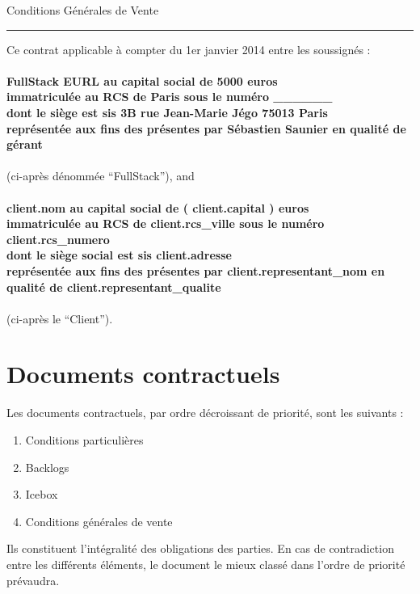 \documentclass[11pt]{article}
\begin{document}
\begin{center}
{\Large Conditions Générales de Vente}
\end{center}

\hrule height .1mm

\vspace{.5cm}

\noindent Ce contrat applicable à compter du 1er janvier 2014 entre les soussignés :
\\
\\
{\bf FullStack EURL au capital social de 5000 euros\\
immatriculée au RCS de Paris sous le numéro ______ \\
dont le siège est sis 3B rue Jean-Marie Jégo 75013 Paris\\
représentée aux fins des présentes par Sébastien Saunier en qualité de gérant
}
\\
\\
(ci-après dénommée ``FullStack''), and\\
\\
{\bf {{ client.nom }} au capital social de {( client.capital )} euros\\
immatriculée au RCS de {{ client.rcs_ville }} sous le numéro {{ client.rcs_numero }}\\
dont le siège social est sis {{ client.adresse }}\\
représentée aux fins des présentes par {{ client.representant_nom }} en qualité de {{ client.representant_qualite }}
}
\\
\\
(ci-après le ``Client'').


\section{Documents contractuels}

Les documents contractuels, par ordre décroissant de priorité, sont les suivants :

\begin{enumerate}
  \item Conditions particulières
  \item Backlogs
  \item Icebox
  \item Conditions générales de vente
\end{enumerate}

Ils constituent l’intégralité des obligations des parties. En cas de contradiction entre les différents éléments, le document le mieux classé dans l’ordre de priorité prévaudra.
\end{document}
